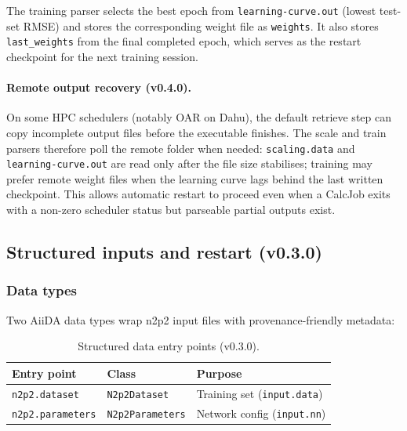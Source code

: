 The training parser selects the best epoch from \texttt{learning-curve.out} (lowest
test-set RMSE) and stores the corresponding weight file as \texttt{weights}.
It also stores \texttt{last\_weights} from the final completed epoch, which serves
as the restart checkpoint for the next training session.

\paragraph{Remote output recovery (v0.4.0).}
On some HPC schedulers (notably OAR on Dahu), the default retrieve step can copy
incomplete output files before the executable finishes.
The scale and train parsers therefore poll the remote folder when needed:
\texttt{scaling.data} and \texttt{learning-curve.out} are read only after the file
size stabilises; training may prefer remote weight files when the learning curve
lags behind the last written checkpoint.
This allows automatic restart to proceed even when a CalcJob exits with a non-zero
scheduler status but parseable partial outputs exist.

\subsection{Structured inputs and restart (v0.3.0)}
\label{subsec:v030-restart}

\subsubsection{Data types}

Two AiiDA data types wrap n2p2 input files with provenance-friendly metadata:

\begin{table}[htbp]
  \centering
  \caption{Structured data entry points (v0.3.0).}
  \label{tab:n2p2-data}
  \begin{tabular}{lll}
    \toprule
    Entry point & Class & Purpose \\
    \midrule
    \texttt{n2p2.dataset}     & \texttt{N2p2Dataset}     & Training set (\texttt{input.data}) \\
    \texttt{n2p2.parameters}  & \texttt{N2p2Parameters}  & Network config (\texttt{input.nn}) \\
    \bottomrule
  \end{tabular}
\end{table}

